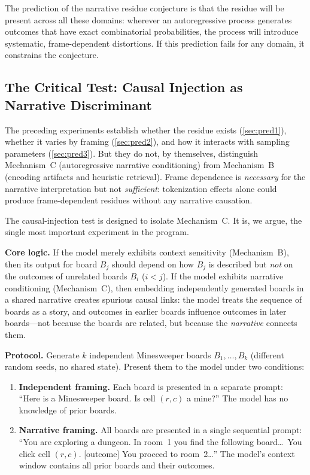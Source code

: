\documentclass[12pt,a4paper]{article}
\theoremstyle{definition}
\theoremstyle{remark}
\begin{document}
The prediction of the narrative residue conjecture is that the
residue will be present across all these domains: wherever an
autoregressive process generates outcomes that have exact
combinatorial probabilities, the process will introduce
systematic, frame-dependent distortions.  If this prediction fails
for any domain, it constrains the conjecture.

\subsection{The Critical Test: Causal Injection as Narrative Discriminant}
\label{sec:causal-injection}

The preceding experiments establish whether the residue exists
(\cref{sec:pred1}), whether it varies by framing
(\cref{sec:pred2}), and how it interacts with sampling parameters
(\cref{sec:pred3}).  But they do not, by themselves, distinguish
Mechanism~C (autoregressive narrative conditioning) from Mechanism~B
(encoding artifacts and heuristic retrieval).  Frame dependence is
\emph{necessary} for the narrative interpretation but not
\emph{sufficient}: tokenization effects alone could produce
frame-dependent residues without any narrative causation.

The causal-injection test is designed to isolate Mechanism~C.  It
is, we argue, the single most important experiment in the program.

\textbf{Core logic.}  If the model merely exhibits context sensitivity
(Mechanism~B), then its output for board $B_j$ should depend on how
$B_j$ is described but \emph{not} on the outcomes of unrelated
boards $B_i$ ($i < j$).  If the model exhibits narrative conditioning
(Mechanism~C), then embedding independently generated boards in a
shared narrative creates spurious causal links: the model treats
the sequence of boards as a story, and outcomes in earlier boards
influence outcomes in later boards---not because the boards are
related, but because the \emph{narrative} connects them.

\textbf{Protocol.}  Generate $k$ independent Minesweeper boards
$B_1, \ldots, B_k$ (different random seeds, no shared state).
Present them to the model under two conditions:

\begin{enumerate}[label=(\alph*)]
  \item \textbf{Independent framing.}  Each board is presented in a
    separate prompt: ``Here is a Minesweeper board.  Is cell $(r,c)$
    a mine?''  The model has no knowledge of prior boards.

  \item \textbf{Narrative framing.}  All boards are presented in a
    single sequential prompt: ``You are exploring a dungeon.  In
    room~1 you find the following board\ldots\ You click cell $(r,c)$.
    [outcome]  You proceed to room~2\ldots''  The model's context
    window contains all prior boards and their outcomes.
\end{enumerate}
\end{document}

